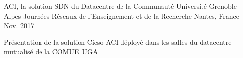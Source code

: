 

\begin{cventries}

  \cventry
    {ACI, la solution SDN du Datacentre de la Communauté Université Grenoble Alpes} %
    {Journées Réseaux de l’Enseignement et de la Recherche} %
    {Nantes, France} %
    {Nov. 2017} %
    {
      \begin{cvitems} %
        \item {Présentation de la solution Cicso ACI déployé dans les salles du datacentre mutualisé de la COMUE UGA}
      \end{cvitems}
    }

\end{cventries}
